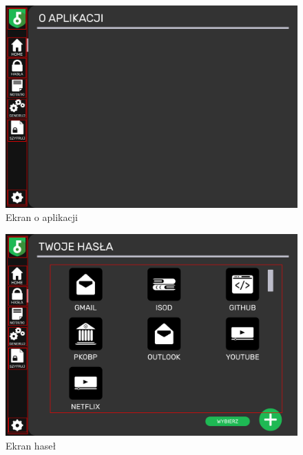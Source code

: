 \documentclass[a4paper]{article}
\begin{document}
\begin{figure}[H]
    \centering
    \includegraphics[height=1\textwidth]{img/ekarn_oapp.png}
    \caption{Ekran o aplikacji}
    \label{fig:oApp}
\end{figure}

\begin{figure}[H]
    \centering
    \includegraphics[width=1\textwidth]{img/ekran_hasel.png}
    \caption{Ekran haseł}
    \label{fig:hasla}
\end{figure}
\end{document}
